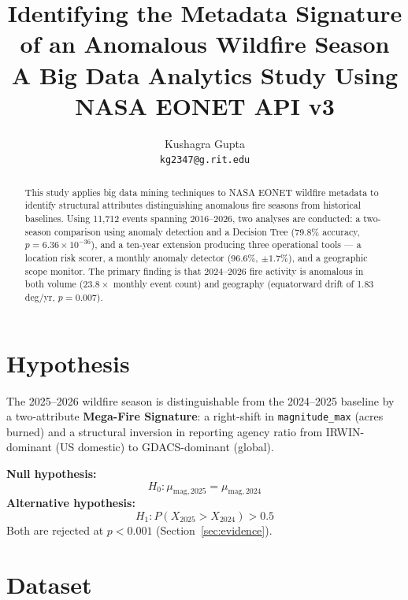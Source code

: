 \documentclass[12pt, letterpaper]{article}
\title{
  \textbf{Identifying the Metadata Signature of an Anomalous Wildfire Season} \\[0.3em]
  \large A Big Data Analytics Study Using NASA EONET API v3
}
\author{Kushagra Gupta \\ \texttt{kg2347@g.rit.edu}}
\date{}
\begin{document}
\maketitle
\tableofcontents
\newpage

\begin{abstract}
This study applies big data mining techniques to NASA EONET wildfire metadata
to identify structural attributes distinguishing anomalous fire seasons from
historical baselines. Using 11,712 events spanning 2016--2026, two analyses
are conducted: a two-season comparison using anomaly detection and a Decision
Tree (79.8\% accuracy, $p = 6.36 \times 10^{-36}$), and a ten-year extension
producing three operational tools --- a location risk scorer, a monthly anomaly
detector (96.6\%, $\pm1.7\%$), and a geographic scope monitor. The primary
finding is that 2024--2026 fire activity is anomalous in both volume
($23.8\times$ monthly event count) and geography (equatorward drift of
1.83 deg/yr, $p = 0.007$).
\end{abstract}

\section{Hypothesis}

The 2025--2026 wildfire season is distinguishable from the 2024--2025 baseline
by a two-attribute \textbf{Mega-Fire Signature}: a right-shift in
\texttt{magnitude\_max} (acres burned) and a structural inversion in reporting
agency ratio from IRWIN-dominant (US domestic) to GDACS-dominant (global).

\textbf{Null hypothesis:}
\begin{equation}
  H_0: \mu_{\text{mag},2025} = \mu_{\text{mag},2024}
\end{equation}
\textbf{Alternative hypothesis:}
\begin{equation}
  H_1: P(X_{2025} > X_{2024}) > 0.5
\end{equation}
Both are rejected at $p < 0.001$ (Section~\ref{sec:evidence}).

\section{Dataset}
\end{document}
